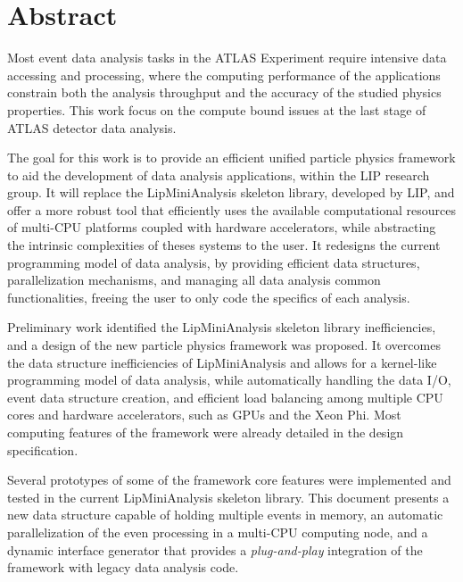 \chapter*{Abstract}
\label{abstract}

Most event data analysis tasks in the ATLAS Experiment require intensive data accessing and processing, where the computing performance of the applications constrain both the analysis throughput and the accuracy of the studied physics properties. This work focus on the compute bound issues at the last stage of ATLAS detector data analysis.

The goal for this work is to provide an efficient unified particle physics framework to aid the development of data analysis applications, within the LIP research group. It will replace the LipMiniAnalysis skeleton library, developed by LIP, and offer a more robust tool that efficiently uses the available computational resources of multi-CPU platforms coupled with hardware accelerators, while abstracting the intrinsic complexities of theses systems to the user. It redesigns the current programming model of data analysis, by providing efficient data structures, parallelization mechanisms, and managing all data analysis common functionalities, freeing the user to only code the specifics of each analysis.

Preliminary work identified the LipMiniAnalysis skeleton library inefficiencies, and a design of the new particle physics framework was proposed. It overcomes the data structure inefficiencies of LipMiniAnalysis and allows for a kernel-like programming model of data analysis, while automatically handling the data I/O, event data structure creation, and efficient load balancing among multiple CPU cores and hardware accelerators, such as GPUs and the \intel Xeon Phi. Most computing features of the framework were already detailed in the design specification.

Several prototypes of some of the framework core features were implemented and tested in the current LipMiniAnalysis skeleton library. This document presents a new data structure capable of holding multiple events in memory, an automatic parallelization of the even processing in a multi-CPU computing node, and a dynamic interface generator that provides a \textit{plug-and-play} integration of the framework with legacy data analysis code.
